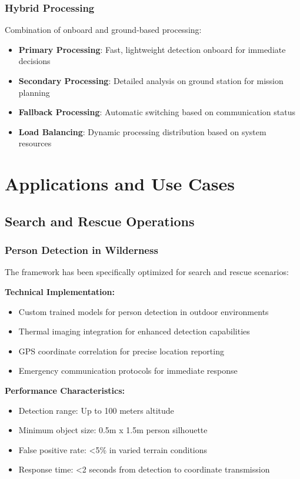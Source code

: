 \documentclass[11pt,a4paper]{article}
\begin{document}
\subsubsection{Hybrid Processing}

Combination of onboard and ground-based processing:

\begin{itemize}
    \item \textbf{Primary Processing}: Fast, lightweight detection onboard for immediate decisions
    \item \textbf{Secondary Processing}: Detailed analysis on ground station for mission planning
    \item \textbf{Fallback Processing}: Automatic switching based on communication status
    \item \textbf{Load Balancing}: Dynamic processing distribution based on system resources
\end{itemize}

\section{Applications and Use Cases}

\subsection{Search and Rescue Operations}

\subsubsection{Person Detection in Wilderness}

The framework has been specifically optimized for search and rescue scenarios:

\textbf{Technical Implementation:}
\begin{itemize}
    \item Custom trained models for person detection in outdoor environments
    \item Thermal imaging integration for enhanced detection capabilities
    \item GPS coordinate correlation for precise location reporting
    \item Emergency communication protocols for immediate response
\end{itemize}

\textbf{Performance Characteristics:}
\begin{itemize}
    \item Detection range: Up to 100 meters altitude
    \item Minimum object size: 0.5m x 1.5m person silhouette
    \item False positive rate: <5\% in varied terrain conditions
    \item Response time: <2 seconds from detection to coordinate transmission
\end{itemize}
\end{document}
